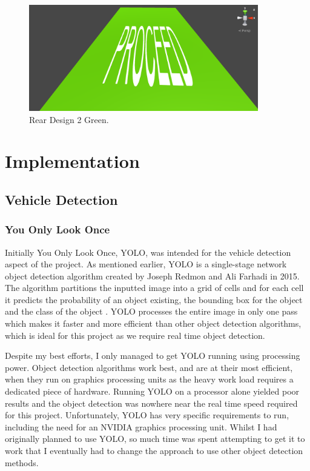 \documentclass{l4proj}
\begin{document}
\begin{figure}[H]
    \centering
    \includegraphics[width=10cm]{images/rear_design2.3.png}
    \caption{Rear Design 2 Green.}
    \label{fig:rear_design2.3}
\end{figure}


\chapter{Implementation}

\section{Vehicle Detection}

\subsection{You Only Look Once}

Initially You Only Look Once, YOLO, was intended for the vehicle detection aspect of the project. As mentioned earlier, YOLO is a single-stage network object detection algorithm created by Joseph Redmon and Ali Farhadi in 2015. The algorithm partitions the inputted image into a grid of cells and for each cell it predicts the probability of an object existing, the bounding box for the object and the class of the object \citep{yolo}. YOLO processes the entire image in only one pass which makes it faster and more efficient than other object detection algorithms, which is ideal for this project as we require real time object detection.

Despite my best efforts, I only managed to get YOLO running using processing power. Object detection algorithms work best, and are at their most efficient, when they run on graphics processing units as the heavy work load requires a dedicated piece of hardware. Running YOLO on a processor alone yielded poor results and the object detection was nowhere near the real time speed required for this project. Unfortunately, YOLO has very specific requirements to run, including the need for an NVIDIA graphics processing unit. Whilst I had originally planned to use YOLO, so much time was spent attempting to get it to work that I eventually had to change the approach to use other object detection methods.
\end{document}
